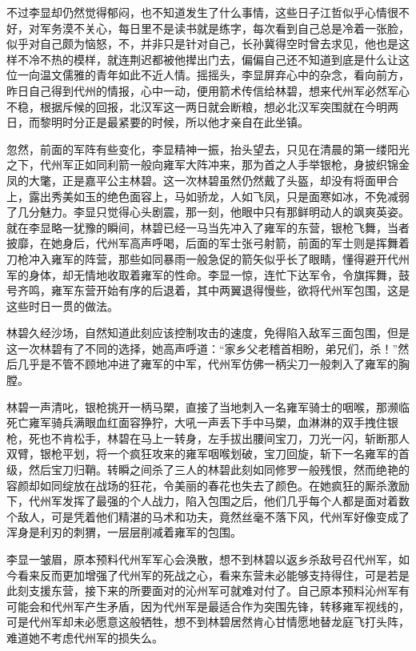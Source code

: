 不过李显却仍然觉得郁闷，也不知道发生了什么事情，这些日子江哲似乎心情很不好，对军务漠不关心，每日里不是读书就是练字，每次看到自己总是冷着一张脸，似乎对自己颇为恼怒，不，并非只是针对自己，长孙冀得空时曾去求见，他也是这样不冷不热的模样，就连荆迟都被他撵出门去，偏偏自己还不知道到底是什么让这位一向温文儒雅的青年如此不近人情。摇摇头，李显屏弃心中的杂念，看向前方，昨日自己得到代州的情报，心中一动，便用箭术传信给林碧，想来代州军必然军心不稳，根据斥候的回报，北汉军这一两日就会断粮，想必北汉军突围就在今明两日，而黎明时分正是最紧要的时候，所以他才亲自在此坐镇。

忽然，前面的军阵有些变化，李显精神一振，抬头望去，只见在清晨的第一缕阳光之下，代州军正如同利箭一般向雍军大阵冲来，那为首之人手举银枪，身披织锦金凤的大氅，正是嘉平公主林碧。这一次林碧虽然仍然戴了头盔，却没有将面甲合上，露出秀美如玉的绝色面容上，马如骄龙，人如飞凤，只是面寒如冰，不免减弱了几分魅力。李显只觉得心头剧震，那一刻，他眼中只有那鲜明动人的飒爽英姿。就在李显略一犹豫的瞬间，林碧已经一马当先冲入了雍军的东营，银枪飞舞，当者披靡，在她身后，代州军高声呼喝，后面的军士张弓射箭，前面的军士则是挥舞着刀枪冲入雍军的阵营，那些如同暴雨一般急促的箭矢似乎长了眼睛，懂得避开代州军的身体，却无情地收取着雍军的性命。李显一惊，连忙下达军令，令旗挥舞，鼓号齐鸣，雍军东营开始有序的后退着，其中两翼退得慢些，欲将代州军包围，这是这些时日一贯的做法。

林碧久经沙场，自然知道此刻应该控制攻击的速度，免得陷入敌军三面包围，但是这一次林碧有了不同的选择，她高声呼道：“家乡父老稽首相盼，弟兄们，杀！”然后几乎是不管不顾地冲进了雍军的中军，代州军仿佛一柄尖刀一般刺入了雍军的胸膛。

林碧一声清叱，银枪挑开一柄马槊，直接了当地刺入一名雍军骑士的咽喉，那濒临死亡雍军骑兵满眼血红面容狰狞，大吼一声丢下手中马槊，血淋淋的双手拽住银枪，死也不肯松手，林碧在马上一转身，左手拔出腰间宝刀，刀光一闪，斩断那人双臂，银枪平划，将一个疯狂攻来的雍军咽喉划破，宝刀回旋，斩下一名雍军的首级，然后宝刀归鞘。转瞬之间杀了三人的林碧此刻如同修罗一般残恨，然而绝艳的容颜却如同绽放在战场的狂花，令美丽的春花也失去了颜色。在她疯狂的厮杀激励下，代州军发挥了最强的个人战力，陷入包围之后，他们几乎每个人都是面对着数个敌人，可是凭着他们精湛的马术和功夫，竟然丝毫不落下风，代州军好像变成了浑身是利刃的刺猬，一层层削减着雍军的包围。

李显一皱眉，原本预料代州军军心会涣散，想不到林碧以返乡杀敌号召代州军，如今看来反而更加增强了代州军的死战之心，看来东营未必能够支持得住，可是若是此刻支援东营，接下来的所要面对的沁州军可就难对付了。自己原本预料沁州军有可能会和代州军产生矛盾，因为代州军是最适合作为突围先锋，转移雍军视线的，可是代州军却未必愿意这般牺牲，想不到林碧居然肯心甘情愿地替龙庭飞打头阵，难道她不考虑代州军的损失么。


